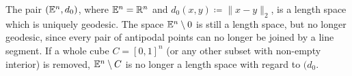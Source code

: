 
\begin{bsp}
  The pair \((\mathbb{E}^n, d_0)\), where \(\mathbb{E}^n = \mathbb{R}^n\) and \(d_0(x,y) \coloneqq \|x - y\|_2\), is a length space which is uniquely geodesic. The space \(\mathbb{E}^n \setminus {0}\) is still a length space, but no longer geodesic, since every pair of antipodal points can no longer be joined by a line segment. If a whole cube \(C= [0,1]^n\) (or any other subset with non-empty interior) is removed, \(\mathbb{E}^n \setminus C\) is no longer a length space with regard to \((d_0\).
\end{bsp}


